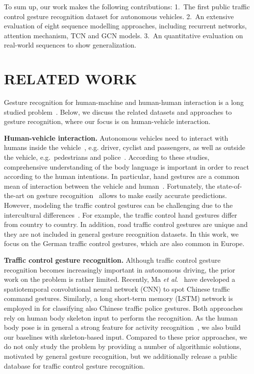 \documentclass[letterpaper, 10 pt, conference]{ieeeconf}
\begin{document}
To sum up, our work makes the following contributions: 1.~The first public traffic control gesture recognition dataset for autonomous vehicles. 2.~An extensive evaluation of eight sequence modelling approaches, including recurrent networks, attention mechanism, TCN and GCN models. 3.~An quantitative evaluation on real-world sequences to show generalization.

\section{RELATED WORK}

Gesture recognition for human-machine and human-human interaction is a long studied problem~\cite{rautaray2015vision, pisharady2015recent}. Below, we discuss the related datasets and approaches to gesture recognition, where our focus is on human-vehicle interaction.

\noindent \textbf{Human-vehicle interaction.} Autonomous vehicles need to interact with humans inside the vehicle~\cite{pickering2007research, ohn2014hand}, e.g. driver, cyclist and passengers, as well as outside the vehicle, e.g.~pedestrians and police~\cite{rasouli2019autonomous}. According to these studies, comprehensive understanding of the body language is important in order to react according to the human intentions. In particular, hand gestures are a common mean of interaction between the vehicle and human~\cite{Sachara2017Free-handReal-time,  Zengeler2019HandCameras}. Fortunately, the state-of-the-art on gesture recognition~\cite{molchanov2015hand, de2016skeleton, lindgren2018learned} allows to make easily accurate predictions. However, modeling the traffic control gestures can be challenging due to the intercultural differences~\cite{Gupta2016ConventionalizedVehicles}. For example, the traffic control hand gestures differ from country to country. In addition, road traffic control gestures are unique and they are not included in general gesture recognition datasets. In this work, we focus on the German traffic control gestures, which are also common in Europe.

\noindent \textbf{Traffic control gesture recognition.} Although traffic control gesture recognition becomes increasingly important in autonomous driving, the prior work on the problem is rather limited. Recently, Ma \textit{et al}.~\cite{Ma2018TrafficNetwork} have developed a spatiotemporal convolutional neural network (CNN) to spot Chinese traffic command gestures. Similarly, a long short-term memory (LSTM) network is employed in \cite{He2019VisualFeatures} for classifying also Chinese traffic police gestures. Both approaches rely on human body skeleton input to perform the recognition. As the human body pose is in general a strong feature for activity recognition~\cite{jhuang2013towards, de2016skeleton}, we also build our baselines with skeleton-based input. Compared to these prior approaches, we do not only study the problem by providing a number of algorithmic solutions, motivated by general gesture recognition, but we additionally release a public database for traffic control gesture recognition.
\end{document}
